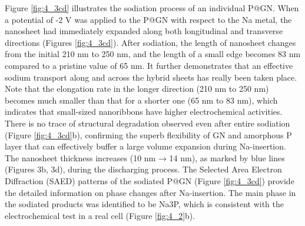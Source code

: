 Figure \ref{fig:4_3cd} illustrates the sodiation process of an individual P@GN. When a potential of -2 V was applied to the P@GN with respect to the Na metal, the nanosheet had immediately expanded along both longitudinal and transverse directions (Figures \ref{fig:4_3cd}). After sodiation, the length of nanosheet changes from the initial 210 nm to 250 nm, and the length of a small edge becomes 83 nm compared to a pristine value of 65 nm. It further demonstrates that an effective sodium transport along and across the hybrid sheets has really been taken place. Note that the elongation rate in the longer direction (210 nm to 250 nm) becomes much smaller than that for a shorter one (65 nm to 83 nm), which indicates that small-sized nanoribbons have higher electrochemical activities. There is no trace of structural degradation observed even after entire sodiation (Figure \ref{fig:4_3cd}b), confirming the superb flexibility of GN and amorphous P layer that can effectively buffer a large volume expansion during Na-insertion. The nanosheet thickness increases (10 nm → 14 nm), as marked by blue lines (Figures 3b, 3d), during the discharging process. The Selected Area Electron Diffraction (SAED) patterns of the sodiated P@GN (Figure \ref{fig:4_3cd}) provide the detailed information on phase changes after Na-insertion. The main phase in the sodiated products was identified to be Na3P, which is consistent with the electrochemical test in a real cell (Figure \ref{fig:4_2}b). 

